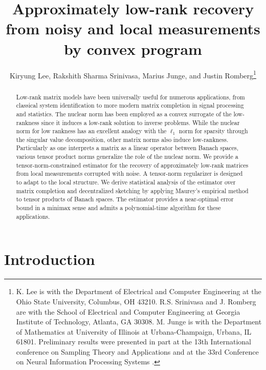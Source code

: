 \documentclass[11pt]{article}
\begin{document}
\title{Approximately low-rank recovery from noisy and local measurements by convex program}

\author{Kiryung Lee, Rakshith Sharma Srinivasa, Marius Junge, and Justin Romberg\thanks{K. Lee is with the Department of Electrical and Computer Engineering at the Ohio State University, Columbus, OH 43210. R.S. Srinivasa and J. Romberg are with the School of Electrical and Computer Engineering at Georgia Institute of Technology, Atlanta, GA 30308. M. Junge is with the Department of Mathematics at University of Illinois at Urbana-Champaign, Urbana, IL 61801. Preliminary results were presented in part at the 13th International conference on Sampling Theory and Applications \cite{lee2019entropy} and at the 33rd Conference on Neural Information Processing Systems \cite{srinivasa2019decentralized}.}}

\maketitle

\begin{abstract}
Low-rank matrix models have been universally useful for numerous applications, from classical system identification to more modern matrix completion in signal processing and statistics. The nuclear norm has been employed as a convex surrogate of the low-rankness since it induces a low-rank solution to inverse problems. While the nuclear norm for low rankness has an excellent analogy with the $\ell_1$ norm for sparsity through the singular value decomposition, other matrix norms also induce low-rankness. Particularly as one interprets a matrix as a linear operator between Banach spaces, various tensor product norms generalize the role of the nuclear norm. We provide a tensor-norm-constrained estimator for the recovery of approximately low-rank matrices from local measurements corrupted with noise. A tensor-norm regularizer is designed to adapt to the local structure. We derive statistical analysis of the estimator over matrix completion and decentralized sketching by applying Maurey's empirical method to tensor products of Banach spaces. The estimator provides a near-optimal error bound in a minimax sense and admits a polynomial-time algorithm for these applications.
\end{abstract}


\section{Introduction}
\end{document}
